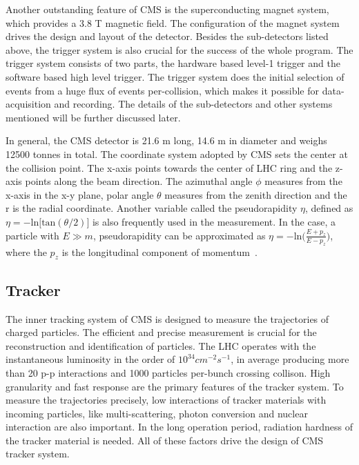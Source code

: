 Another outstanding feature of CMS is the superconducting magnet system, which provides a 3.8 T magnetic field. The configuration of the magnet system drives the design and layout of the detector. Besides the sub-detectors listed above, the trigger system is also crucial for the success of the whole program. The trigger system consists of two parts, the hardware based level-1 trigger and the software based high level trigger. The trigger system does the initial selection of events from a huge flux of events per-collision, which makes it possible for data-acquisition and recording. The details of the sub-detectors and other systems mentioned will be further discussed later. 

In general, the CMS detector is 21.6 m long, 14.6 m in diameter and weighs 12500 tonnes in total. The coordinate system adopted by CMS sets the center at the collision point. The x-axis points towards the center of LHC ring and the z-axis points along the beam direction. The azimuthal angle $\phi$  measures from the x-axis in the x-y plane, polar angle $\theta$ measures from the zenith direction  and the r is the radial coordinate. Another variable called the pseudorapidity $\eta$, defined as $\eta=-\textrm{ln}\big[\textrm{tan}(\theta/2)\big]$ is also frequently used in the measurement. In the case, a particle with $E\gg m$, pseudorapidity can be approximated as $\eta=-\textrm{ln}\big(\frac{E+p_{z}}{E-p_{z}}\big)$, where the $p_{z}$ is the longitudinal component of momentum~\cite{CMS_experiment}. 

\subsection{Tracker}
The inner tracking system of CMS is designed to measure the trajectories of charged particles. The efficient and precise measurement is crucial for the reconstruction and identification of particles. The LHC operates with the instantaneous luminosity in the order of $10^{34}cm^{-2}s^{-1}$, in average producing more than 20 p-p interactions and 1000 particles per-bunch crossing collison. High granularity and fast response are the primary features of the tracker system. To measure the trajectories precisely, low interactions of tracker materials with incoming particles, like multi-scattering, photon conversion and nuclear interaction are also important. In the long operation period, radiation hardness of the tracker material is needed. All of these factors drive the design of CMS tracker system.

